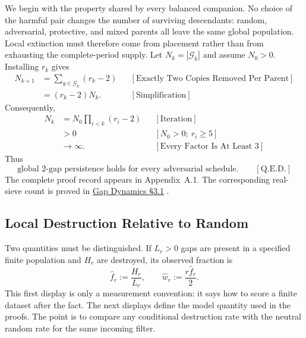 We begin with the property shared by every balanced companion. No choice of the harmful pair changes the number of surviving descendants: random, adversarial, protective, and mixed parents all leave the same global population. Local extinction must therefore come from placement rather than from exhausting the complete-period supply.
Let $N_k=|\mathcal G_k|$ and assume $N_0>0$. Installing $r_k$ gives
\begin{equation*}
\begin{aligned}
N_{k+1}
&=\sum_{g\in\mathcal G_k}(r_k-2)
&&[\text{Exactly Two Copies Removed Per Parent}]\\
&=(r_k-2)N_k.
&&[\text{Simplification}]
\end{aligned}
\end{equation*}
Consequently,
\begin{equation*}
\begin{aligned}
N_k
&=N_0\prod_{i < k}(r_i-2)
&&[\text{Iteration}]\\
& > 0
&&[N_0>0;\ r_i\ge5]\\
&\longrightarrow\infty.
&&[\text{Every Factor Is At Least }3]
\end{aligned}
\end{equation*}
Thus
\begin{equation*}
\text{global 2-gap persistence holds for every adversarial schedule.}
\qquad[\text{Q.E.D.}]
\end{equation*}
The complete proof record appears in Appendix~A.1. The corresponding real-sieve count is proved in \href{https://github.com/thiagomata/prime-numbers/blob/master/articles/chapter6/gap-dynamics.md#31-exact-global-2-gap-count}{Gap Dynamics \S{}3.1} \cite{gapdynamics2026}.
\subsection{Local Destruction Relative to Random}
Two quantities must be distinguished. If $L_r > 0$ gaps are present in a specified finite population and $H_r$ are destroyed, its observed fraction is
\begin{equation*}
\widehat f_r:=\frac{H_r}{L_r},
\qquad \widehat w_r:=\frac{r\widehat f_r}{2}.
\end{equation*}
This first display is only a measurement convention: it says how to score a finite dataset after the fact. The next displays define the model quantity used in the proofs. The point is to compare any conditional destruction rate with the neutral random rate for the same incoming filter.


